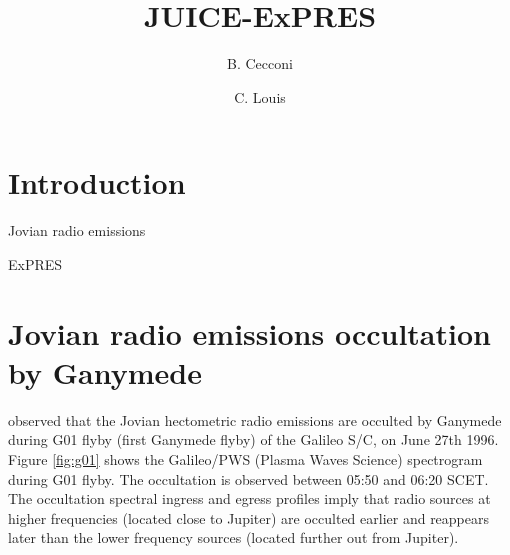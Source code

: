 \documentclass[referee]{aa}
\begin{document}
 


   \title{JUICE-ExPRES}

   \subtitle{}

   \author{B. Cecconi
          \and
          C. Louis
          }


   \date{}

 
  \abstract
   {}
   {}
   {}
   {}
   {}


   \maketitle
%

\section{Introduction}

Jovian radio emissions

ExPRES \citep{Louis_AA_2019}   


\section{Jovian radio emissions occultation by Ganymede}
\citet{kurth_GRL_97} observed that the Jovian hectometric radio emissions are occulted by Ganymede during G01 flyby (first Ganymede flyby) of the Galileo S/C, on June 27th 1996. Figure \ref{fig:g01} shows the Galileo/PWS (Plasma Waves Science) \citep{gurnett_SSR_92} spectrogram during G01 flyby. The occultation is observed between 05:50 and 06:20 SCET. The occultation spectral ingress and egress profiles imply that radio sources at higher frequencies (located close to Jupiter) are occulted earlier and reappears later than the lower frequency sources (located further out from Jupiter).
\end{document}
